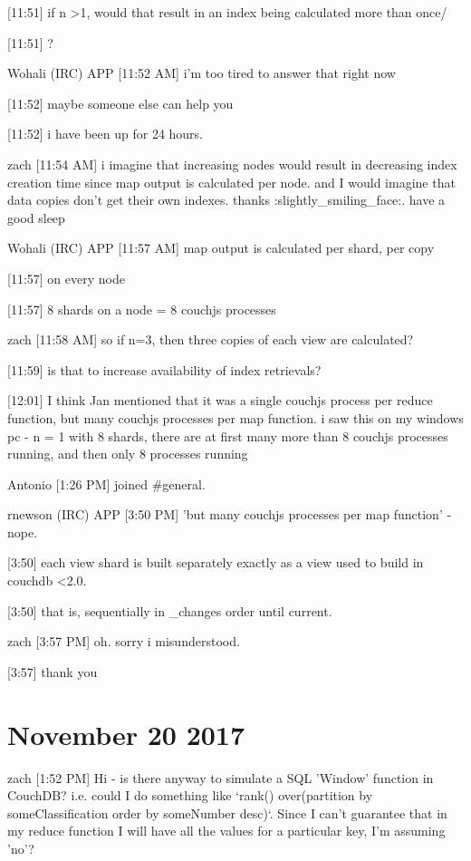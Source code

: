 [11:51]
if n \textgreater 1, would that result in an index being calculated more than once/

[11:51]
?

Wohali (IRC) APP [11:52 AM]
i'm too tired to answer that right now

    [11:52]
maybe someone else can help you

    [11:52]
i have been up for 24 hours.

zach [11:54 AM]
i imagine that increasing nodes would result in decreasing index creation time since map output is calculated per node. and I would imagine that data copies don't get their own indexes. thanks :slightly\_smiling\_face:. have a good sleep

Wohali (IRC) APP [11:57 AM]
map output is calculated per shard, per copy

    [11:57]
on every node

    [11:57]
8 shards on a node = 8 couchjs processes

zach [11:58 AM]
so if n=3, then three copies of each view are calculated?

[11:59]
is that to increase availability of index retrievals?

[12:01]
I think Jan mentioned that it was a single couchjs process per reduce function, but many couchjs processes per map function. i saw this on my windows pc - n = 1 with 8 shards, there are at first many more than 8 couchjs processes running, and then only 8 processes running

Antonio [1:26 PM]
joined \#general.

rnewson (IRC) APP [3:50 PM]
'but many couchjs processes per map function' - nope.

[3:50]
each view shard is built separately exactly as a view used to build in couchdb \textless 2.0.

[3:50]
that is, sequentially in \_changes order until current.

zach [3:57 PM]
oh. sorry i misunderstood.

[3:57]
thank you

\section{November 20 2017}
\label{slack-20-nov}
zach [1:52 PM]
Hi - is there anyway to simulate a SQL 'Window' function in CouchDB? i.e. could I do something like `rank() over(partition by someClassification order by someNumber desc)`. Since I can't guarantee that in my reduce function I will have all the values for a particular key, I'm assuming 'no'?

